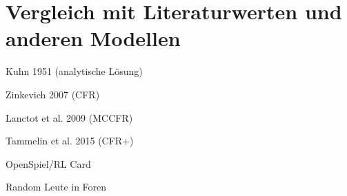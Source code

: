 \section{Vergleich mit Literaturwerten und anderen Modellen}
Kuhn 1951 (analytische Lösung)

Zinkevich 2007 (CFR)

Lanctot et al. 2009 (MCCFR)

Tammelin et al. 2015 (CFR+)

OpenSpiel/RL Card

Random Leute in Foren


